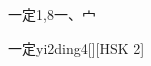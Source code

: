 \begin{entry}{一定}{1,8}{⼀、⼧}
  \begin{phonetics}{一定}{yi2ding4}[][HSK 2]
  \end{phonetics}
\end{entry}
